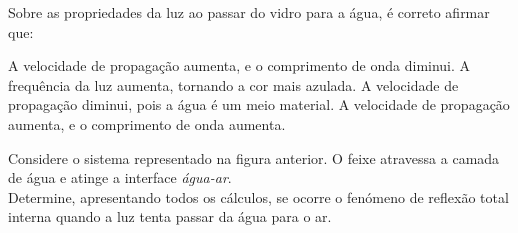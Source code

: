 \documentclass[addpoints]{exam}
\begin{document}
\begin{questions}
{\begin{minipage}{0.6\textwidth}
			\end{minipage}
		}
		
		\vspace{15pt}
		\question[8] Sobre as propriedades da luz ao passar do vidro para a água, é correto afirmar que:
		
		\begin{randomizechoices}
			\choice A velocidade de propagação aumenta, e o comprimento de onda diminui.
			\choice A frequência da luz aumenta, tornando a cor mais azulada.
			\choice A velocidade de propagação diminui, pois a água é um meio material.
			\correctchoice A velocidade de propagação aumenta, e o comprimento de onda aumenta.
		\end{randomizechoices}
		
		\vspace{15pt}
		\question[12] Considere o sistema representado na figura anterior. O feixe atravessa a camada de água e atinge a interface \textit{água-ar}.\\
		Determine, apresentando todos os cálculos, se ocorre o fenómeno de reflexão total interna quando a luz tenta passar da água para o ar.


\end{questions}
\end{document}
